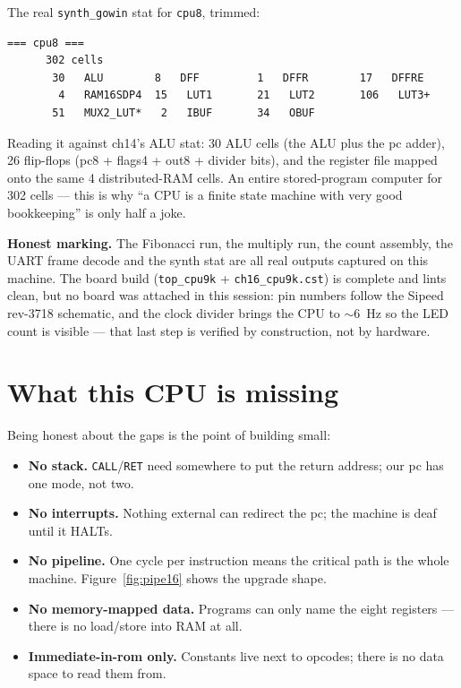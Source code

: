 \begin{example}
The real \texttt{synth\_gowin} stat for \texttt{cpu8}, trimmed:

\begin{lstlisting}[caption={A working CPU in 302 cells --- less than
4\% of the smallest FPGA this book uses.}]
=== cpu8 ===
      302 cells
       30   ALU        8   DFF         1   DFFR        17   DFFRE
        4   RAM16SDP4  15   LUT1       21   LUT2       106   LUT3+
       51   MUX2_LUT*   2   IBUF       34   OBUF
\end{lstlisting}

Reading it against ch14's ALU stat: 30 ALU cells (the ALU plus the
pc adder), 26 flip-flops (pc8 + flags4 + out8 + divider bits), and
the register file mapped onto the same 4 distributed-RAM cells. An
entire stored-program computer for 302 cells --- this is why ``a CPU
is a finite state machine with very good bookkeeping'' is only half
a joke.
\end{example}

\textbf{Honest marking.} The Fibonacci run, the multiply run, the
count assembly, the UART frame decode and the synth stat are all real
outputs captured on this machine. The board build (\texttt{top\_cpu9k}
+ \texttt{ch16\_cpu9k.cst}) is complete and lints clean, but no board
was attached in this session: pin numbers follow the Sipeed rev-3718
schematic, and the clock divider brings the CPU to $\sim$6~Hz so the
LED count is visible --- that last step is verified by construction,
not by hardware.

\section{What this CPU is missing}\label{sec:missing16}

Being honest about the gaps is the point of building small:

\begin{itemize}
\item \textbf{No stack.} \texttt{CALL}/\texttt{RET} need somewhere to
put the return address; our pc has one mode, not two.
\item \textbf{No interrupts.} Nothing external can redirect the pc;
the machine is deaf until it HALTs.
\item \textbf{No pipeline.} One cycle per instruction means the
critical path is the whole machine. Figure~\ref{fig:pipe16} shows the
upgrade shape.
\item \textbf{No memory-mapped data.} Programs can only name the eight
registers --- there is no load/store into RAM at all.
\item \textbf{Immediate-in-rom only.} Constants live next to opcodes;
there is no data space to read them from.
\end{itemize}

